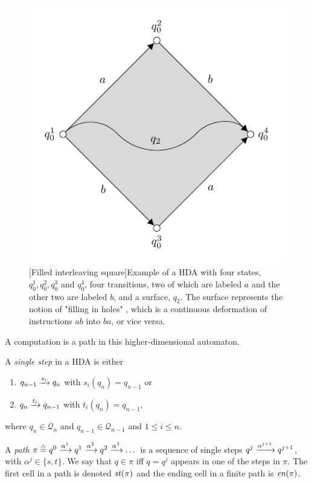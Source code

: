     \begin{figure}[ht]
        \centering
        \includegraphics[scale=1.2]{Figures/3.An-introduction-to-non-interleaving-models-for-concurrency/HDA_filled_interleaving_square/filled-interleaving-diamond.pdf}
         [Filled interleaving square]{Example of a HDA with four states, $q^1_0, q^2_0, q^3_0$ and $q^4_0$, four transitions, two of which are labeled $a$ and the other two are labeled $b$, and a surface, $q_2$. The surface represents the notion of "filling in holes" \cite[Section 2]{pratt91hda}, which is a continuous deformation of instructions $ab$ into $ba$, or vice versa.}
        \label{fig:HDA-filled-interleaving-square}
    \end{figure}
    
    A computation is a path in this higher-dimensional automaton.
    
    \begin{definition}\label{def_paths_HDA}
        \label{def:paths-in-HDAs}
        A \emph{single step} in a HDA is either
        \begin{enumerate}
            \item $q_{n-1}\xrightarrow{s_{i}}q_{n}$ with $s_{i}(q_{n})=q_{n-1}$ or 
            \item $q_{n}\xrightarrow{t_{i}}q_{n-1}$ with $t_{i}(q_{n})=q_{n-1}$, 
        \end{enumerate}
        \noindent where $q_{n}\in \mathcal{Q}_{n}$ and $q_{n-1}\in \mathcal{Q}_{n-1}$ and $1\leq i\leq n$. 

        A \emph{path} $\pi\overset{\scriptscriptstyle\triangle}{=} q^{0}\xrightarrow{\alpha^{1}}q^{1}\xrightarrow{\alpha^{2}}q^{2}\xrightarrow{\alpha^{3}}\dots$ is a sequence of single steps $q^{j}\xrightarrow{\alpha^{j+1}}q^{j+1}$, with $\alpha^{j}\in\{s,t\}$. We say that $q\in\pi$ iff $q=q^{j}$ appears in one of the steps in $\pi$.  The first cell in a path is denoted $\mathit{st}(\pi)$ and the ending cell in a finite path is $\mathit{en}(\pi)$. 
    \end{definition}
    
